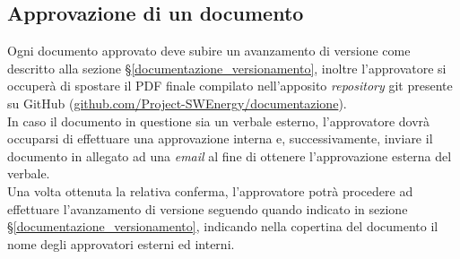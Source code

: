 \subsection{Approvazione di un documento}
Ogni documento approvato deve subire un avanzamento di versione come descritto alla sezione \S\ref{documentazione_versionamento}, inoltre l'approvatore si occuperà di spostare il PDF finale compilato nell'apposito \textit{repository} git presente su GitHub (\href{https://github.com/Project-SWEnergy/documentazione}{github.com/Project-SWEnergy/documentazione}). \\

\noindent
In caso il documento in questione sia un verbale esterno, l'approvatore dovrà occuparsi di effettuare una approvazione interna e, successivamente, inviare il documento in allegato ad una \textit{email} al fine di ottenere l'approvazione esterna del verbale. \\
Una volta ottenuta la relativa conferma, l'approvatore potrà procedere ad effettuare l'avanzamento di versione seguendo quando indicato in sezione \S\ref{documentazione_versionamento}, indicando nella copertina del documento il nome degli approvatori esterni ed interni.